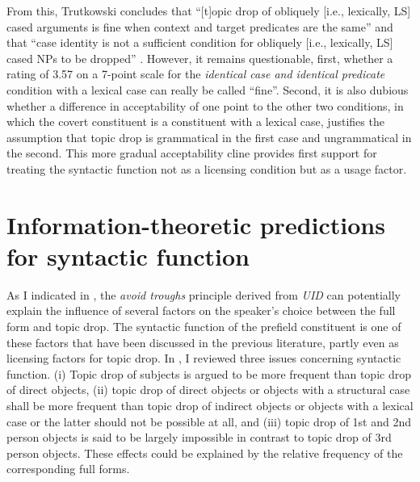 From this, Trutkowski concludes that ``[t]opic drop of obliquely [i.e., lexically, LS] cased arguments  is fine when context and target predicates are the same'' and that ``case identity is not a sufficient condition for obliquely [i.e., lexically, LS] cased NPs to be dropped'' \citep[4]{trutkowski2018}.
However, it remains questionable, first, whether a rating of 3.57 on a 7-point scale for the \textit{identical case and identical predicate} condition with a lexical case  can really be called ``fine''.
Second, it is also dubious whether a difference in acceptability of one point to the other two conditions, in which the covert constituent is a constituent with a lexical case,  justifies the assumption that topic drop is grammatical in the first case and ungrammatical in the second.
This more gradual acceptability cline provides first support for treating the syntactic function not as a licensing condition but as a usage factor. 

\section{Information-theoretic predictions for syntactic function}\label{sec:info.theory.function}  
As I indicated in , the \textit{avoid troughs} principle derived from \textit{UID}  can potentially explain the influence of several factors on the speaker's choice between the full form and topic drop.
The syntactic function of the prefield constituent is one of these factors that have been discussed  in the previous literature, partly even as licensing factors for topic drop.
In , I reviewed three issues concerning syntactic function.
(i) Topic drop of subjects is argued to be more frequent than topic drop of direct objects, (ii) topic drop of direct objects or objects with a structural case  shall be more frequent than topic drop of indirect objects or objects with a lexical case  or the latter should not be possible at all, and (iii) topic drop of 1st and 2nd person objects is said to be largely impossible in contrast to topic drop of 3rd person objects.
These effects could be explained by the relative frequency of the corresponding full forms.

